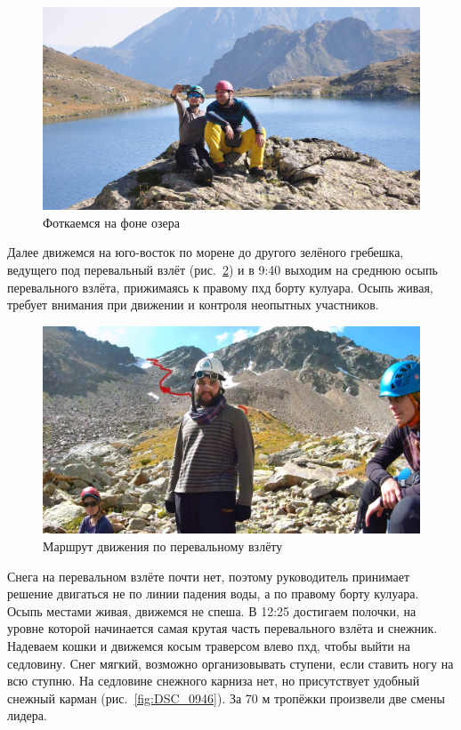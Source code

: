  \begin{figure}[h!]
 	\centering
 	\includegraphics[width=0.7\linewidth]{../pics/DSC_0907}
 	\caption{Фоткаемся на фоне озера}
 	\label{fig:DSC_0907}
 \end{figure}
 

Далее движемся на юго-восток по морене до другого зелёного гребешка, ведущего под перевальный взлёт (рис.~\ref{fig:20aug2.jpg}) и в 9:40 выходим на среднюю осыпь перевального взлёта, прижимаясь к правому пхд борту кулуара. Осыпь живая, требует внимания при движении и контроля неопытных участников.

\begin{figure}[h!]
	\centering
	\includegraphics[width=0.7\linewidth]{../pics/20aug2.jpg}
	\caption{Маршрут движения по перевальному взлёту}
	\label{fig:20aug2.jpg}
\end{figure}

Снега на перевальном взлёте почти нет, поэтому руководитель принимает решение двигаться не по линии падения воды, а по правому борту кулуара. Осыпь местами живая, движемся не спеша. В 12:25 достигаем полочки, на уровне которой начинается самая крутая часть перевального взлёта и снежник. Надеваем кошки и движемся косым траверсом влево пхд, чтобы выйти на седловину. Снег мягкий, возможно организовывать ступени, если ставить ногу на всю ступню. На седловине снежного карниза нет, но присутствует удобный снежный карман (рис.~\ref{fig:DSC_0946}). За 70 м тропёжки произвели две смены лидера.


